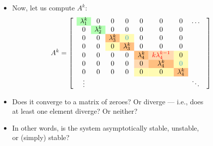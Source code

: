 \begin{frame}
\myPause
 \begin{itemize}[<+-| alert@+>]
 \item Now, let us compute $A^k$:\myPause
 \begin{displaymath}
  A^k = 
  \begin{bmatrix}
   \-& \cellcolor{green!30!white}{\lambda_{1}^k} & 0 & 0 & 0 & 0 & 0 & 0 & \ldots & \\
   \-& 0 &\cellcolor{green!30!white}{\lambda_{2}^k}  & 0 & 0 & 0 & 0 & 0 \\
   \-& 0 & 0 &\cellcolor{orange!50!white}{\lambda_{3}^k}
             &\cellcolor{yellow!30!white}{\textcolor{cyan!80!black}{0}} & 0 & 0 & 0 \\
   \-& 0 & 0 &\cellcolor{yellow!30!white}{0}
             &\cellcolor{orange!50!white}{\lambda_{3}^k} & 0 & 0 & 0 \\
   \-& 0 & 0 & 0 & 0 &\cellcolor{orange!50!white}{\lambda_{4}^k}
                     &\cellcolor{orange!30!white}{\textcolor{red}{k\lambda_4^{k-1}}} & \cellcolor{yellow!30!white}{0} \\
   \-& 0 & 0 & 0 & 0 &\cellcolor{orange!30!white}{0}
                     &\cellcolor{orange!50!white}{\lambda_{4}^k}
                     & \cellcolor{yellow!30!white}{\textcolor{cyan!80!black}{0}} \\
   \-& 0 & 0 & 0 & 0 &\cellcolor{yellow!30!white}{0}
                     &\cellcolor{yellow!30!white}{0} & \cellcolor{orange!50!white}{\lambda_{4}^k} \\
   \-& \vdots &&&&&&& \ddots \\
  \end{bmatrix}
 \end{displaymath}\myPause
 \item Does it converge to a matrix of zeroes? Or diverge --- i.e., does\\
       at least one element diverge? Or neither?
 \item In other words, is the system asymptotically stable, unstable,\\
       or (simply) stable?
 \end{itemize}
\end{frame}


